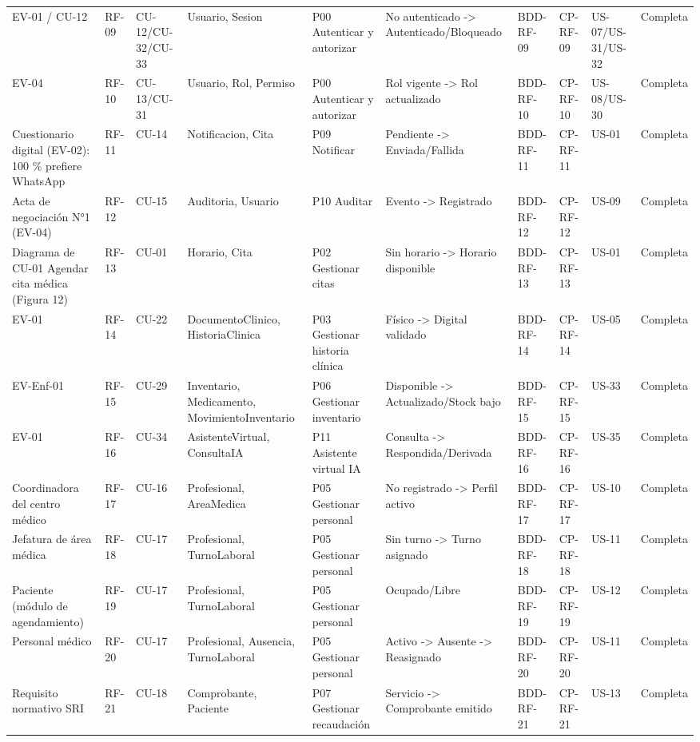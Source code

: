 \documentclass[11pt,a4paper]{article}
\begin{document}
\begin{appendices}
\begin{landscape}
\begin{longtable}{p{2.2cm}p{1.8cm}p{2cm}p{3cm}p{3cm}p{3cm}p{2cm}p{2cm}p{2cm}p{1.6cm}}
				EV-01 / CU-12 & RF-09 & CU-12/CU-32/CU-33 & Usuario, Sesion & P00 Autenticar y autorizar & No autenticado -> Autenticado/Bloqueado & BDD-RF-09 & CP-RF-09 & US-07/US-31/US-32 & Completa\\
				EV-04 & RF-10 & CU-13/CU-31 & Usuario, Rol, Permiso & P00 Autenticar y autorizar & Rol vigente -> Rol actualizado & BDD-RF-10 & CP-RF-10 & US-08/US-30 & Completa\\
				Cuestionario digital (EV-02): 100 \% prefiere WhatsApp & RF-11 & CU-14 & Notificacion, Cita & P09 Notificar & Pendiente -> Enviada/Fallida & BDD-RF-11 & CP-RF-11 & US-01 & Completa\\
				Acta de negociación N°1 (EV-04) & RF-12 & CU-15 & Auditoria, Usuario & P10 Auditar & Evento -> Registrado & BDD-RF-12 & CP-RF-12 & US-09 & Completa\\
				Diagrama de CU-01 Agendar cita médica (Figura 12) & RF-13 & CU-01 & Horario, Cita & P02 Gestionar citas & Sin horario -> Horario disponible & BDD-RF-13 & CP-RF-13 & US-01 & Completa\\
				EV-01 & RF-14 & CU-22 & DocumentoClinico, HistoriaClinica & P03 Gestionar historia clínica & Físico -> Digital validado & BDD-RF-14 & CP-RF-14 & US-05 & Completa\\
				EV-Enf-01 & RF-15 & CU-29 & Inventario, Medicamento, MovimientoInventario & P06 Gestionar inventario & Disponible -> Actualizado/Stock bajo & BDD-RF-15 & CP-RF-15 & US-33 & Completa\\
				EV-01 & RF-16 & CU-34 & AsistenteVirtual, ConsultaIA & P11 Asistente virtual IA & Consulta -> Respondida/Derivada & BDD-RF-16 & CP-RF-16 & US-35 & Completa\\
				Coordinadora del centro médico & RF-17 & CU-16 & Profesional, AreaMedica & P05 Gestionar personal & No registrado -> Perfil activo & BDD-RF-17 & CP-RF-17 & US-10 & Completa\\
				Jefatura de área médica & RF-18 & CU-17 & Profesional, TurnoLaboral & P05 Gestionar personal & Sin turno -> Turno asignado & BDD-RF-18 & CP-RF-18 & US-11 & Completa\\
				Paciente (módulo de agendamiento) & RF-19 & CU-17 & Profesional, TurnoLaboral & P05 Gestionar personal & Ocupado/Libre & BDD-RF-19 & CP-RF-19 & US-12 & Completa\\
				Personal médico & RF-20 & CU-17 & Profesional, Ausencia, TurnoLaboral & P05 Gestionar personal & Activo -> Ausente -> Reasignado & BDD-RF-20 & CP-RF-20 & US-11 & Completa\\
				Requisito normativo SRI & RF-21 & CU-18 & Comprobante, Paciente & P07 Gestionar recaudación & Servicio -> Comprobante emitido & BDD-RF-21 & CP-RF-21 & US-13 & Completa\\

\end{longtable}
\end{landscape}
\end{appendices}
\end{document}
